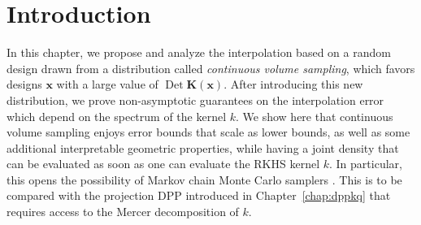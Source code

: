 \documentclass[twoside,11pt]{book}
\numberwithin{theorem}{chapter}
\numberwithin{definition}{chapter}
\numberwithin{proposition}{chapter}
\numberwithin{corollary}{chapter}
\numberwithin{example}{chapter}
\numberwithin{lemma}{chapter}
\numberwithin{assumption}{chapter}
\numberwithin{equation}{chapter}
\numberwithin{figure}{chapter}
\DeclareMathOperator{\Det}{Det}
\DeclareMathOperator{\X}{\mathcal{X}}
\newcommand{\pc}[1]{\textcolor{blue}{#1}}
\begin{document}
\section{Introduction}
\label{CVS_sec:introduction}


In this chapter, we propose and analyze the interpolation based on a random design drawn from a distribution called \emph{continuous volume sampling}, which favors designs $\bm{x}$ with a large value of $\Det \bm{K}(\bm{x})$. After introducing this new distribution, we prove non-asymptotic guarantees on the interpolation error which depend on the spectrum of the kernel $k$. 
We show here that continuous volume sampling enjoys error bounds that scale as lower bounds, as well as some additional interpretable geometric properties, while having a joint density that can be evaluated as soon as one can evaluate the RKHS kernel $k$. In particular, this opens the possibility of Markov chain Monte Carlo samplers \parencite{ReGh19}. This is to be compared with the projection DPP introduced in Chapter~\ref{chap:dppkq} that requires access to the Mercer decomposition of $k$.
\end{document}
